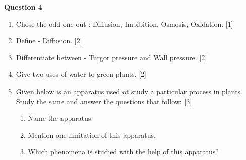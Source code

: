 \noindent
\textbf{Question 4}
\begin{enumerate}[label=(\alph*)]
    \item Chose the odd one out : Diffusion, Imbibition, Osmosis, Oxidation. \hfill[1]
    \item Define - Diffusion. \hfill[2]
    \item Differentiate between - Turgor pressure and Wall pressure. \hfill[2]
    \item Give two uses of water to green plants. \hfill[2]
    \item Given below is an apparatus used ot study a particular process in plants. 
        Study the same and answer the questions that follow: \hfill[3]


        \begin{enumerate}[label=(\roman*)]
        \setlength\itemsep{0em}
        \item Name the apparatus.
        \item Mention one limitation of this apparatus.
        \item Which phenomena is studied with the help of this apparatus?
        \end{enumerate}
\end{enumerate}

